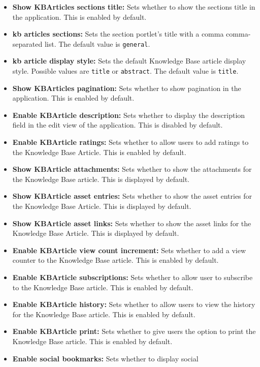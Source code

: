 \begin{itemize}
\item
  \textbf{Show KBArticles sections title:} Sets whether to show the
  sections title in the application. This is enabled by default.
\item
  \textbf{kb articles sections:} Sets the section portlet's title with a
  comma comma-separated list. The default value is \texttt{general}.
\item
  \textbf{kb article display style:} Sets the default Knowledge Base
  article display style. Possible values are \texttt{title} or
  \texttt{abstract}. The default value is \texttt{title}.
\item
  \textbf{Show KBArticles pagination:} Sets whether to show pagination
  in the application. This is enabled by default.
\item
  \textbf{Enable KBArticle description:} Sets whether to display the
  description field in the edit view of the application. This is
  disabled by default.
\item
  \textbf{Enable KBArticle ratings:} Sets whether to allow users to add
  ratings to the Knowledge Base Article. This is enabled by default.
\item
  \textbf{Show KBArticle attachments:} Sets whether to show the
  attachments for the Knowledge Base article. This is displayed by
  default.
\item
  \textbf{Show KBArticle asset entries:} Sets whether to show the asset
  entries for the Knowledge Base Article. This is displayed by default.
\item
  \textbf{Show KBArticle asset links:} Sets whether to show the asset
  links for the Knowledge Base Article. This is displayed by default.
\item
  \textbf{Enable KBArticle view count increment:} Sets whether to add a
  view counter to the Knowledge Base article. This is enabled by
  default.
\item
  \textbf{Enable KBArticle subscriptions:} Sets whether to allow user to
  subscribe to the Knowledge Base article. This is enabled by default.
\item
  \textbf{Enable KBArticle history:} Sets whether to allow users to view
  the history for the Knowledge Base article. This is enabled by
  default.
\item
  \textbf{Enable KBArticle print:} Sets whether to give users the option
  to print the Knowledge Base article. This is enabled by default.
\item
  \textbf{Enable social bookmarks:} Sets whether to display social

\end{itemize}
